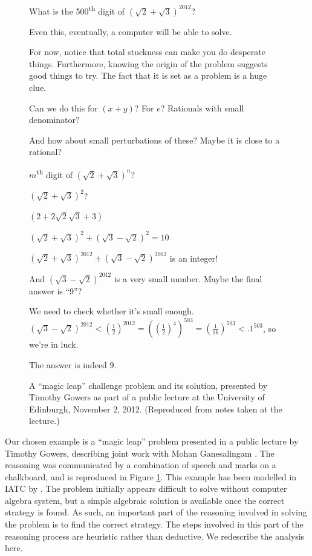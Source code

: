 \documentclass[smallextended,oneside]{svjour3}       %
\newcommand\nothing[1]{#1}
\let\paragraph\nothing
\begin{document}
\begin{figure}
\begin{mdframed}
%
What is the 500\textsuperscript{th} digit of $(\sqrt{2}+\sqrt{3})^{2012}$?

%
Even this, eventually, a computer will be able to solve.

%
For now, notice that total stuckness can make you do desperate things.
Furthermore, knowing the origin of the problem suggests good things to try.
The fact that it is set as a problem is a huge clue.

%
Can we do this for $(x+y)$? For $e$? Rationals with small denominator?

%
And how about small perturbations of these?  Maybe it is close to a rational?

%
$m$\textsuperscript{th} digit of $(\sqrt{2}+\sqrt{3})^n$?

%
$(\sqrt{2}+\sqrt{3})^2$?

%
$(2+2\sqrt{2}\sqrt{3}+3)$

%
$(\sqrt{2}+\sqrt{3})^2+(\sqrt{3}-\sqrt{2})^2=10$

%
$(\sqrt{2}+\sqrt{3})^{2012}+(\sqrt{3}-\sqrt{2})^{2012}$ is an integer!

%
And $(\sqrt{3}-\sqrt{2})^{2012}$ is a very small number.  Maybe the final answer is ``$9$''?

%
We need to check whether it's small enough. $(\sqrt{3}-\sqrt{2})^{2012}<\left(\frac{1}{2}\right)^{2012}=
\left(\left(\frac{1}{2}\right)^{4}\right)^{503}=
\left(\frac{1}{16}\right)^{503}<.1^{503}$, so we're in luck.

%
The answer is indeed $9$.
\end{mdframed}
\caption{A ``magic leap'' challenge problem and its solution, presented by Timothy Gowers as part of a public lecture at the University of Edinburgh, November 2, 2012.  (Reproduced from notes taken at the lecture.)\label{fig:magic-leap}}
\end{figure}

\paragraph{Our chosen example is a ``magic leap'' problem presented in a public lecture by Timothy Gowers, describing joint work with Mohan Ganesalingam \citeyearpar{gowers-talk}.}
The reasoning was communicated by a combination of speech and marks
on a chalkboard, and is reproduced in Figure \ref{fig:magic-leap}.
This example has been modelled in IATC by \citet{corneli2017modelling}.
The problem initially appears difficult to solve without computer algebra
system, but a simple algebraic solution is available
once the correct strategy is found.  As such, an
important part of the reasoning involved in solving the problem is to
find the correct strategy.  The steps involved in this part of the
reasoning process are heuristic rather than deductive.  We redescribe
the analysis here.
\end{document}
